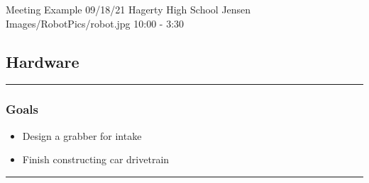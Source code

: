 \insertmeeting 
	{Meeting Example} 
	{09/18/21}
	{Hagerty High School}
	{Jensen}
	{Images/RobotPics/robot.jpg}
	{10:00 - 3:30}
	
\subsection*{Hardware}
\noindent\hfil\rule{\textwidth}{.4pt}\hfil
\subsubsection*{Goals}
\begin{itemize}
    \item Design a grabber for intake
    \item Finish constructing car drivetrain  

\end{itemize} 

\noindent\hfil\rule{\textwidth}{.4pt}\hfil

